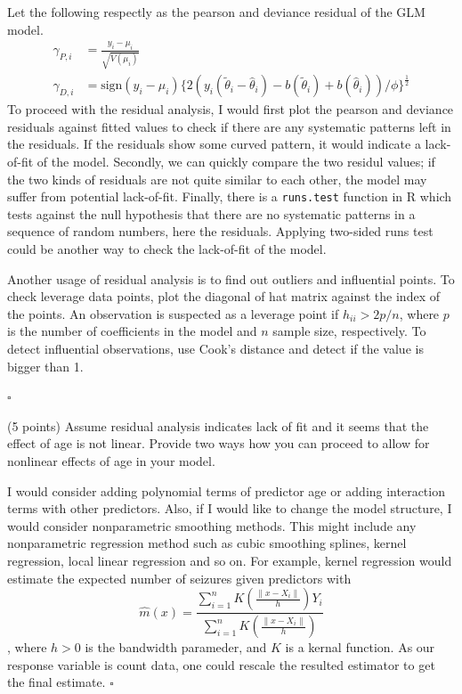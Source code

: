 \documentclass[11pt]{article}
\newcommand{\0}{{\mathbf{0}}}
\newcommand{\1}{{\mathbf{1}}}
\newcommand{\pr}[1]{\noindent{\bf #1.}}
\newcommand{\so}{\noindent{\textsc{Solution.\;\;}}}
\newcommand{\ed}{\hfill$\square$}
\begin{document}
Let the following respectly as the pearson and deviance residual of the GLM model.
\begin{align*}
\gamma_{P,i} &= \frac{y_i-\mu_i}{\sqrt{V(\mu_i)}}\\
\gamma_{D,i} &= \text{sign}(y_i-\mu_i)\{2(y_i (\tilde{\theta}_i - \hat{\theta}_i) - b(\tilde{\theta}_i) + b(\hat{\theta}_i) )/\phi\}^{\frac{1}{2}}
\end{align*}
To proceed with the residual analysis, I would first plot the pearson and deviance residuals against fitted values to check if there are any systematic patterns left in the residuals. If the residuals show some curved pattern, it would indicate a lack-of-fit of the model.
Secondly, we can quickly compare the two residul values; if the two kinds of residuals are not quite similar to each other, the model may suffer from potential lack-of-fit. Finally, there is a \texttt{runs.test} function in R which tests against the null hypothesis that there are no systematic patterns in a sequence of random numbers, here the residuals. Applying two-sided runs test could be another way to check the lack-of-fit of the model.

Another usage of residual analysis is to find out outliers and influential points. To check leverage data points, plot the diagonal of hat matrix against the index of the points. An observation is suspected as a leverage point if $h_{ii} > 2p/n$, where $p$ is the number of coefficients in the model and $n$ sample size, respectively. To detect influential observations, use Cook’s distance and detect if the value is bigger than 1.

\ed

\pr{6} (5 points) Assume residual analysis indicates lack of fit and it seems that the effect of age is not linear. Provide two ways how you can proceed to allow for nonlinear effects of age in your model.

\so

I would consider adding polynomial terms of predictor age or adding interaction terms with other predictors. Also, if I would like to change the model structure, I would consider nonparametric smoothing methods. This might include any nonparametric regression method such as cubic smoothing splines, kernel regression, local linear regression and so on. For example, kernel regression would estimate the expected number of seizures given predictors with 
$$
\hat{m}(x) = \frac{\sum_{i=1}^n K(\frac{\|x-X_i\|}{h})Y_i}{\sum_{i=1}^n K(\frac{\|x-X_i\|}{h})}
$$
, where $h>0$ is the bandwidth parameder, and $K$ is a kernal function. As our response variable is count data, one could rescale the resulted estimator to get the final estimate.
\ed
\end{document}
